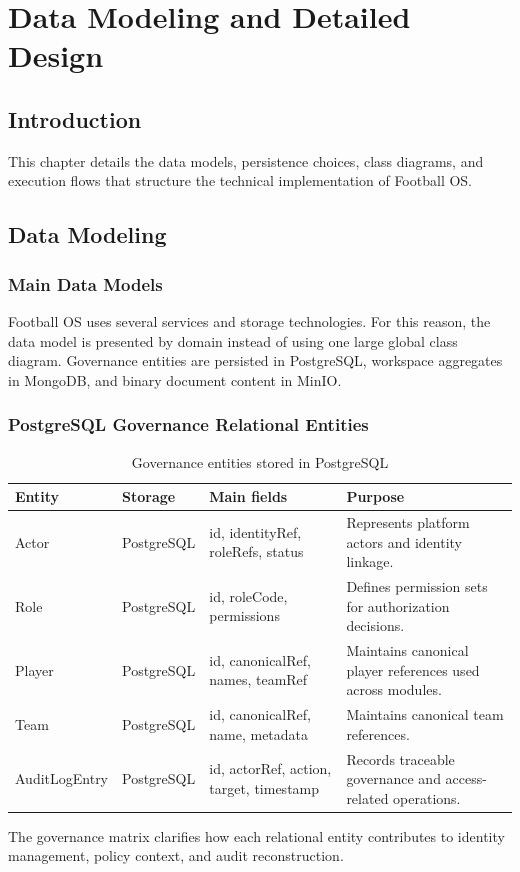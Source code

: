 ﻿%
\chapter{Data Modeling and Detailed Design}

\section*{Introduction}

This chapter details the data models, persistence choices, class diagrams, and
execution flows that structure the technical implementation of Football OS.

\section{Data Modeling}

\subsection{Main Data Models}

Football OS uses several services and storage technologies. For this reason,
the data model is presented by domain instead of using one large global class
diagram. Governance entities are persisted in PostgreSQL, workspace aggregates
in MongoDB, and binary document content in MinIO.

\subsection{PostgreSQL Governance Relational Entities}

\begin{table}[H]
\centering
\caption{Governance entities stored in PostgreSQL}
\label{tab:governance-postgresql}
\small
\setlength{\tabcolsep}{4pt}
\renewcommand{\arraystretch}{1.10}
\begin{tabularx}{\textwidth}{|L{2.5cm}|C{1.9cm}|Y|Y|}
\hline
\textbf{Entity} & \textbf{Storage} & \textbf{Main fields} & \textbf{Purpose} \\
\hline
Actor & PostgreSQL & id, identityRef, roleRefs, status & Represents platform actors and identity linkage. \\
\hline
Role & PostgreSQL & id, roleCode, permissions & Defines permission sets for authorization decisions. \\
\hline
Player & PostgreSQL & id, canonicalRef, names, teamRef & Maintains canonical player references used across modules. \\
\hline
Team & PostgreSQL & id, canonicalRef, name, metadata & Maintains canonical team references. \\
\hline
AuditLogEntry & PostgreSQL & id, actorRef, action, target, timestamp & Records traceable governance and access-related operations. \\
\hline
\end{tabularx}
\normalsize
\setlength{\tabcolsep}{6pt}
\end{table}
The governance matrix clarifies how each relational entity contributes to
identity management, policy context, and audit reconstruction.

